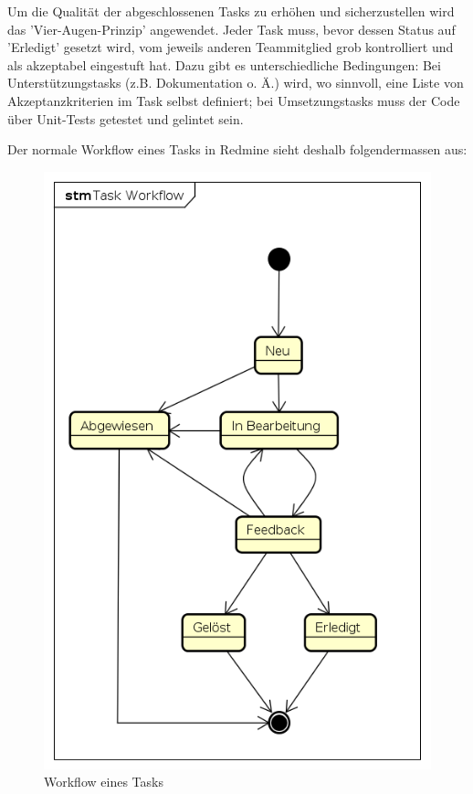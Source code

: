 Um die Qualität der abgeschlossenen Tasks zu erhöhen und sicherzustellen wird das 'Vier-Augen-Prinzip' angewendet. Jeder Task muss, bevor dessen Status auf 'Erledigt' gesetzt wird, vom jeweils anderen Teammitglied grob kontrolliert und als akzeptabel eingestuft hat. Dazu gibt es unterschiedliche Bedingungen: Bei Unterstützungstasks (z.B. Dokumentation o. Ä.) wird, wo sinnvoll, eine Liste von Akzeptanzkriterien im Task selbst definiert; bei Umsetzungstasks muss der Code über Unit-Tests getestet und gelintet sein.

Der normale Workflow eines Tasks in Redmine sieht deshalb folgendermassen aus:

\begin{figure}[H]
	\centering
	\includegraphics[]{fig/task_workflow}
	\caption{Workflow eines Tasks}
	\label{fig:pm:workflow}
\end{figure}

